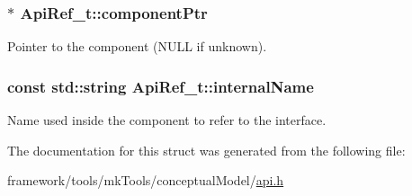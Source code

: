 \subsubsection[{\texorpdfstring{component\+Ptr}{componentPtr}}]{$\ast$ Api\+Ref\+\_\+t\+::component\+Ptr}\hypertarget{struct_api_ref__t_ac359ce19c6cd21ac7d193fa17f4da468}{}\label{struct_api_ref__t_ac359ce19c6cd21ac7d193fa17f4da468}


Pointer to the component (N\+U\+LL if unknown). 

\subsubsection[{\texorpdfstring{internal\+Name}{internalName}}]{\setlength{\rightskip}{0pt plus 5cm}const std\+::string Api\+Ref\+\_\+t\+::internal\+Name}\hypertarget{struct_api_ref__t_a42c611d9424fadbc56c1bce7bdebf708}{}\label{struct_api_ref__t_a42c611d9424fadbc56c1bce7bdebf708}


Name used inside the component to refer to the interface. 



The documentation for this struct was generated from the following file\+:\begin{DoxyCompactItemize}
\item 
framework/tools/mk\+Tools/conceptual\+Model/\hyperlink{api_8h}{api.\+h}\end{DoxyCompactItemize}
